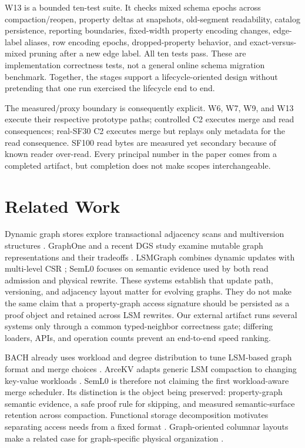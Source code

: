 \documentclass[sigconf,screen]{cidr-2027}
\newcommand{\sys}{SemL0\xspace}
\begin{document}
W13 is a bounded ten-test suite. It checks mixed schema epochs across
compaction/reopen, property deltas at snapshots, old-segment readability,
catalog persistence, reporting boundaries, fixed-width property encoding
changes, edge-label aliases, row encoding epochs, dropped-property behavior,
and exact-versus-mixed pruning after a new edge label. All ten tests pass.
These are implementation correctness tests, not a general online schema
migration benchmark. Together, the stages support a lifecycle-oriented design
without pretending that one run exercised the lifecycle end to end.

The measured/proxy boundary is consequently explicit. W6, W7, W9, and W13
execute their respective prototype paths; controlled C2 executes merge and
read consequences; real-SF30 C2 executes merge but replays only metadata for
the read consequence. SF100 read bytes are measured yet secondary because of
known reader over-read. Every principal number in the paper comes from a
completed artifact, but completion does not make scopes interchangeable.

\section{Related Work}

Dynamic graph stores explore transactional adjacency scans and multiversion
structures \cite{livegraph,teseo}. GraphOne and a recent DGS study examine
mutable graph representations and their tradeoffs \cite{graphone,revisitingdgs}.
LSMGraph combines dynamic updates with multi-level CSR \cite{lsmgraph}; \sys
focuses on semantic evidence used by both read admission and physical rewrite.
These systems establish that update path, versioning, and adjacency layout
matter for evolving graphs. They do not make the same claim that a
property-graph access signature should be persisted as a proof object and
retained across LSM rewrites. Our external artifact runs several systems only
through a common typed-neighbor correctness gate; differing loaders, APIs, and
operation counts prevent an end-to-end speed ranking.

BACH already uses workload and degree distribution to tune LSM-based graph
format and merge choices \cite{bach}. ArceKV adapts generic LSM compaction to
changing key-value workloads \cite{arcekv}. \sys is therefore not claiming the
first workload-aware merge scheduler. Its distinction is the object being
preserved: property-graph semantic evidence, a safe proof rule for skipping,
and measured semantic-surface retention across compaction. Functional storage
decomposition motivates separating access needs from a fixed format
\cite{functionalstorage}. Graph-oriented columnar layouts make a related case
for graph-specific physical organization \cite{columnargraph}.
\end{document}
